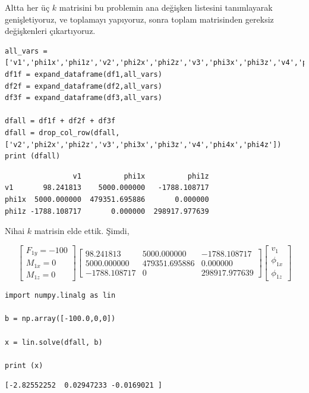 \documentclass[12pt,fleqn]{article}\usepackage{../../common}
\begin{document}
Altta her üç $k$ matrisini bu problemin ana değişken listesini tanımlayarak
genişletiyoruz, ve toplamayı yapıyoruz, sonra toplam matrisinden gereksiz
değişkenleri çıkartıyoruz.

\begin{verbatim}
all_vars = ['v1','phi1x','phi1z','v2','phi2x','phi2z','v3','phi3x','phi3z','v4','phi4x','phi4z']
df1f = expand_dataframe(df1,all_vars)
df2f = expand_dataframe(df2,all_vars)
df3f = expand_dataframe(df3,all_vars)
  
dfall = df1f + df2f + df3f
dfall = drop_col_row(dfall, ['v2','phi2x','phi2z','v3','phi3x','phi3z','v4','phi4x','phi4z'])
print (dfall)
\end{verbatim}

\begin{verbatim}
                v1          phi1x          phi1z
v1       98.241813    5000.000000   -1788.108717
phi1x  5000.000000  479351.695886       0.000000
phi1z -1788.108717       0.000000  298917.977639
\end{verbatim}

Nihai $k$ matrisin elde ettik. Şimdi,

$$
\left[\begin{array}{c}
F_{1y} = -100 \\ M_{1x} = 0 \\ M_{1z} = 0
\end{array}\right]
\left[\begin{array}{ccc}
   98.241813 &   5000.000000 &   -1788.108717 \\
 5000.000000 &  479351.695886 &       0.000000 \\
-1788.108717  &      0 &  298917.977639
\end{array}\right]
\left[\begin{array}{c}
v_1 \\ \phi_{1x} \\ \phi_{1z}
\end{array}\right]
$$

\begin{verbatim}
import numpy.linalg as lin

b = np.array([-100.0,0,0])

x = lin.solve(dfall, b)

print (x)
\end{verbatim}

\begin{verbatim}
[-2.82552252  0.02947233 -0.0169021 ]
\end{verbatim}
\end{document}
